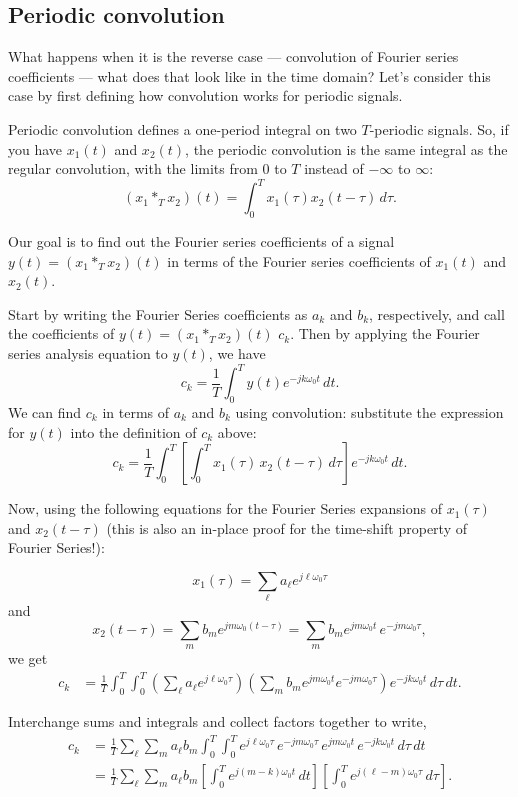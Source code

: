 \subsection{Periodic convolution}
\label{sec:w6l2-periodic-convolution}
What happens when it is the reverse case --- convolution of Fourier series coefficients --- what does that look like in the time domain? Let's consider this case by first defining how convolution works for periodic signals. 

Periodic convolution defines a one-period integral on two $T$-periodic
signals. So, if you have $x_1(t)$ and $x_2(t)$, the periodic convolution is the same integral as the regular convolution, with the limits from $0$ to $T$ instead of $-\infty$ to $\infty$:
\[
(x_1 *_T x_2)(t)=\int_0^T x_1(\tau)x_2(t-\tau)\,d\tau.
\]

Our goal is to find out the Fourier series coefficients of a signal $y(t) = (x_1 *_T x_2)(t)$ in terms of the Fourier series coefficients of $x_1(t)$ and $x_2(t)$.

Start by writing the Fourier Series coefficients as $a_k$ and $b_k$, respectively, and
call the coefficients of $y(t)=(x_1 *_T x_2)(t)$ $c_k$. Then by applying the Fourier series analysis equation to $y(t)$, we have
\[
c_k=\frac1T\int_0^T y(t)e^{-jk\omega_0t}\,dt.
\]
We can find $c_k$ in terms of $a_k$ and $b_k$ using convolution: substitute the expression for $y(t)$ into the definition of $c_k$ above:
\[
c_k=\frac1T\int_{0}^{T} \left[\int_{0}^{T} x_1(\tau)\,x_2(t-\tau)\,d\tau\right]
e^{-jk\omega_0 t}\,dt .
\]

Now, using the following equations for the Fourier Series expansions of $x_1(\tau)$ and $x_2(t-\tau)$ (this is also an in-place proof for the time-shift property of Fourier Series!):

\[
x_1(\tau)=\sum_{\ell} a_\ell e^{j\ell\omega_0 \tau}
\]
and
\[
x_2(t-\tau)=\sum_{m} b_m e^{jm\omega_0 (t-\tau)}
= \sum_{m} b_m e^{jm\omega_0 t}\,e^{-jm\omega_0 \tau},
\]
we get
\[
\begin{aligned}
c_k
&=\frac1T\int_{0}^{T}\!\!\int_{0}^{T}
\left(\sum_{\ell} a_\ell e^{j\ell\omega_0 \tau}\right)
\left(\sum_{m} b_m e^{jm\omega_0 t}e^{-jm\omega_0 \tau}\right)
e^{-jk\omega_0 t}\,d\tau\,dt .
\end{aligned}
\]

Interchange sums and integrals and collect factors together to write,
\[
\begin{aligned}
c_k
&=\frac1T\sum_{\ell}\sum_{m} a_\ell b_m
\int_{0}^{T}\!\!\int_{0}^{T}
e^{j\ell\omega_0 \tau} \, e^{-jm\omega_0 \tau}\,
e^{jm\omega_0 t}\,e^{-jk\omega_0 t}\, d\tau\,dt \\
&=\frac1T\sum_{\ell}\sum_{m} a_\ell b_m
\left[\int_{0}^{T} e^{j(m-k)\omega_0 t}\,dt\right]
\left[\int_{0}^{T} e^{j(\ell-m)\omega_0 \tau}\,d\tau\right].
\end{aligned}
\]

